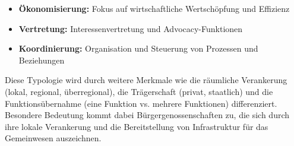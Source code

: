 \begin{itemize}
\item \textbf{Ökonomisierung:} Fokus auf wirtschaftliche Wertschöpfung und Effizienz
\item \textbf{Vertretung:} Interessenvertretung und Advocacy-Funktionen
\item \textbf{Koordinierung:} Organisation und Steuerung von Prozessen und Beziehungen
\end{itemize}

Diese Typologie wird durch weitere Merkmale wie die räumliche Verankerung (lokal, regional, überregional), die Trägerschaft (privat, staatlich) und die Funktionsübernahme (eine Funktion vs. mehrere Funktionen) differenziert. Besondere Bedeutung kommt dabei Bürgergenossenschaften zu, die sich durch ihre lokale Verankerung und die Bereitstellung von Infrastruktur für das Gemeinwesen auszeichnen.
